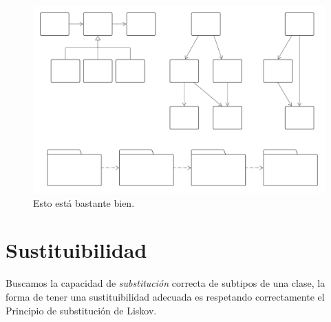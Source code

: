 \documentclass[a4paper,11pt]{article}
\begin{document}
\begin{figure}[!h]
    \centering
    \includegraphics[scale=.5]{assets/gc1.png}
    \caption{Esto está bastante bien.}
\end{figure}

\section{Sustituibilidad}
Buscamos la capacidad de \emph{substitución} correcta de subtipos de una clase, 
la forma de tener una sustituibilidad adecuada es respetando correctamente el 
Principio de substitución de Liskov.

{}

\end{document}
